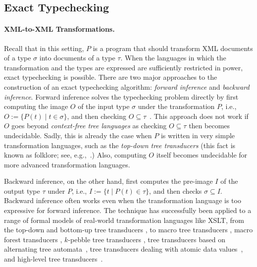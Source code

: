\documentclass[twoside,leqno,onecolumn,pdftex]{article}
\begin{document}
\begin{scientific}

\subsection*{Exact Typechecking}


\paragraph*{XML-to-XML Transformations.}
\label{sec:xml-transformations}

Recall that in this setting, $P$ is a program that should transform
XML documents of a type $\sigma$ into documents of a type $\tau$.
When the languages in which the transformation and the types are
expressed are sufficiently restricted in power, exact typechecking is
possible.  There are two major approaches to the construction of an
exact typechecking algorithm: {\em forward inference} and {\em
  backward inference}.  Forward inference solves the typechecking
problem directly by first computing the image $O$ of the input type
$\sigma$ under the transformation $P$, i.e., $O := \{ P(t) \mid t \in
\sigma \}$, and then checking $O \subseteq
\tau$~\cite{DBLP:journals/jcss/MiloSV03,Murata97,PapakonstantinouVianu00,DBLP:journals/jcss/MartensN07,DBLP:journals/sigmod/Suciu02}.
This approach does not work if $O$ goes beyond \emph{context-free tree
  languages} as checking $O \subseteq \tau$ then becomes undecidable.
Sadly, this is already the case when $P$ is written in very simple
transformation languages, such as the \emph{top-down tree transducers}
(this fact is known as folklore; see, e.g.,~\cite{FrischHosoya07}.)
Also, computing $O$ itself becomes undecidable for more advanced
transformation languages.

Backward inference, on the other hand, first computes the pre-image
$I$ of the output type $\tau$ under $P$, i.e., $I := \{ t \mid P(t)\in
\tau \}$, and then checks $\sigma \subseteq I$.  Backward inference
often works even when the transformation language is too expressive
for forward inference. The technique has successfully been applied to
a range of formal models of real-world transformation languages like
XSLT, from the top-down and bottom-up tree transducers
\cite{Engelfriet77}, to macro tree transducers
\cite{Engelfriet85,Maneth07,FrischHosoya07}, macro forest transducers
\cite{Perst04}, $k$-pebble tree transducers
\cite{DBLP:journals/jcss/MiloSV03}, tree transducers based on
alternating tree automata~\cite{Tozawa01}, tree transducers dealing
with atomic data values~\cite{DBLP:journals/sigmod/Suciu02}, and high-level tree
transducers~\cite{Tozawa06}.


\end{scientific}
\end{document}
